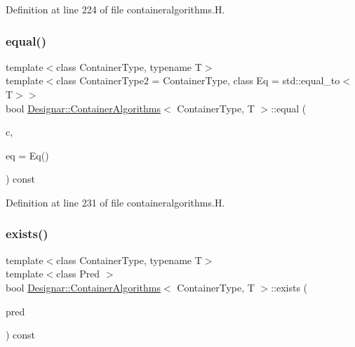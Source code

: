 Definition at line 224 of file containeralgorithms.\+H.

\mbox{\label{class_designar_1_1_container_algorithms_aece8141a994780c15205aa76d306219b}} 
\subsubsection{\texorpdfstring{equal()}{equal()}\hspace{0.1cm}{\footnotesize\ttfamily [2/2]}}
{\footnotesize\ttfamily template$<$class Container\+Type, typename T$>$ \\
template$<$class Container\+Type2  = Container\+Type, class Eq  = std\+::equal\+\_\+to$<$\+T$>$$>$ \\
bool \hyperlink{class_designar_1_1_container_algorithms}{Designar\+::\+Container\+Algorithms}$<$ Container\+Type, T $>$\+::equal (\begin{DoxyParamCaption}\item[{const Container\+Type2 \&}]{c,  }\item[{Eq \&\&}]{eq = {\ttfamily Eq()} }\end{DoxyParamCaption}) const\hspace{0.3cm}{\ttfamily [inline]}}



Definition at line 231 of file containeralgorithms.\+H.

\mbox{\label{class_designar_1_1_container_algorithms_a84b04f83c37c70e2b25e943ca0579261}} 
\subsubsection{\texorpdfstring{exists()}{exists()}\hspace{0.1cm}{\footnotesize\ttfamily [1/2]}}
{\footnotesize\ttfamily template$<$class Container\+Type, typename T$>$ \\
template$<$class Pred $>$ \\
bool \hyperlink{class_designar_1_1_container_algorithms}{Designar\+::\+Container\+Algorithms}$<$ Container\+Type, T $>$\+::exists (\begin{DoxyParamCaption}\item[{Pred \&}]{pred }\end{DoxyParamCaption}) const\hspace{0.3cm}{\ttfamily [inline]}}



